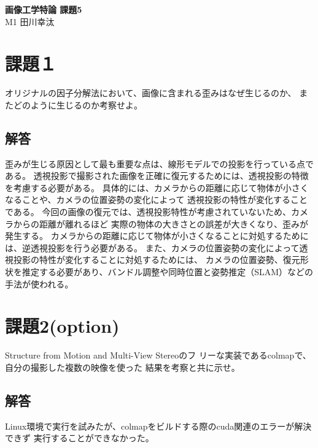 \documentclass[]{jarticle}          %
\begin{document}

\vspace*{2ex}
\begin{center}
 {\Large \bf 画像工学特論 課題5}\\ %
 \vspace*{5mm}
 {\large M1 田川幸汰}%
\end{center}



\section{課題１}
オリジナルの因子分解法において、画像に含まれる歪みはなぜ生じるのか、
またどのように生じるのか考察せよ。
\subsection{解答}
歪みが生じる原因として最も重要な点は、線形モデルでの投影を行っている点である。
透視投影で撮影された画像を正確に復元するためには、透視投影の特徴を考慮する必要がある。
具体的には、カメラからの距離に応じて物体が小さくなることや、カメラの位置姿勢の変化によって
透視投影の特性が変化することである。
今回の画像の復元では、透視投影特性が考慮されていないため、カメラからの距離が離れるほど
実際の物体の大きさとの誤差が大きくなり、歪みが発生する。
カメラからの距離に応じて物体が小さくなることに対処するためには、逆透視投影を行う必要がある。
また、カメラの位置姿勢の変化によって透視投影の特性が変化することに対処するためには、
カメラの位置姿勢、復元形状を推定する必要があり、バンドル調整や同時位置と姿勢推定（SLAM）などの手法が使われる。

\section{課題2(option)}
Structure from Motion and Multi-View Stereoのフ
リーな実装であるcolmapで、自分の撮影した複数の映像を使った
結果を考察と共に示せ。
\subsection{解答}
Linux環境で実行を試みたが、colmapをビルドする際のcuda関連のエラーが解決できず
実行することができなかった。
\end{document}
